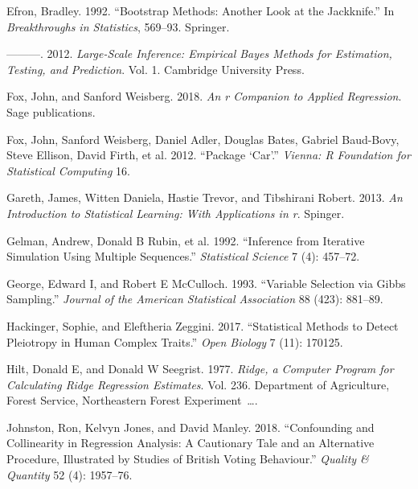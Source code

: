 \begin{CSLReferences}{1}{0}
\leavevmode{}%
Efron, Bradley. 1992. {``Bootstrap Methods: Another Look at the Jackknife.''} In \emph{Breakthroughs in Statistics}, 569--93. Springer.

\leavevmode{}%
---------. 2012. \emph{Large-Scale Inference: Empirical Bayes Methods for Estimation, Testing, and Prediction}. Vol. 1. Cambridge University Press.

\leavevmode{}%
Fox, John, and Sanford Weisberg. 2018. \emph{An r Companion to Applied Regression}. Sage publications.

\leavevmode{}%
Fox, John, Sanford Weisberg, Daniel Adler, Douglas Bates, Gabriel Baud-Bovy, Steve Ellison, David Firth, et al. 2012. {``Package {`Car'}.''} \emph{Vienna: R Foundation for Statistical Computing} 16.

\leavevmode{}%
Gareth, James, Witten Daniela, Hastie Trevor, and Tibshirani Robert. 2013. \emph{An Introduction to Statistical Learning: With Applications in r}. Spinger.

\leavevmode{}%
Gelman, Andrew, Donald B Rubin, et al. 1992. {``Inference from Iterative Simulation Using Multiple Sequences.''} \emph{Statistical Science} 7 (4): 457--72.

\leavevmode{}%
George, Edward I, and Robert E McCulloch. 1993. {``Variable Selection via Gibbs Sampling.''} \emph{Journal of the American Statistical Association} 88 (423): 881--89.

\leavevmode{}%
Hackinger, Sophie, and Eleftheria Zeggini. 2017. {``Statistical Methods to Detect Pleiotropy in Human Complex Traits.''} \emph{Open Biology} 7 (11): 170125.

\leavevmode{}%
Hilt, Donald E, and Donald W Seegrist. 1977. \emph{Ridge, a Computer Program for Calculating Ridge Regression Estimates}. Vol. 236. Department of Agriculture, Forest Service, Northeastern Forest Experiment~\ldots.

\leavevmode{}%
Johnston, Ron, Kelvyn Jones, and David Manley. 2018. {``Confounding and Collinearity in Regression Analysis: A Cautionary Tale and an Alternative Procedure, Illustrated by Studies of British Voting Behaviour.''} \emph{Quality \& Quantity} 52 (4): 1957--76.


\end{CSLReferences}
